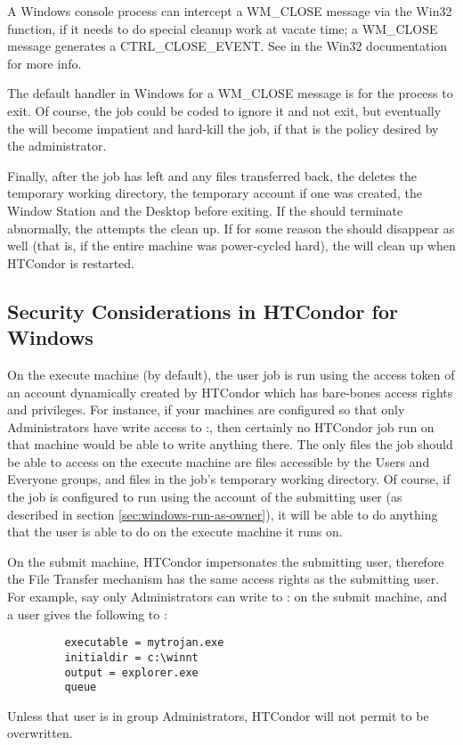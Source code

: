 \Note A Windows console process can intercept a WM\_CLOSE message
via the Win32  function,
if it needs to do special cleanup work at vacate time; 
a WM\_CLOSE message generates a CTRL\_CLOSE\_EVENT.
See  in the Win32
documentation for more info.

\Note The default handler in Windows for a WM\_CLOSE message is for the
process to exit.  Of course, the job could be coded to ignore it and not
exit, but eventually the  will become impatient and hard-kill
the job, if that is the policy desired by the administrator.

Finally, after the job has left and any files transferred back, 
the  deletes the temporary working directory, 
the temporary account if one was created,
the Window Station and the Desktop before exiting. 
If the  should terminate abnormally, 
the  attempts the clean up.  
If for some reason the  should disappear as well
(that is, if the entire machine was power-cycled hard),
the  will clean up when HTCondor is restarted.

\subsection{Security Considerations in HTCondor for Windows}

On the execute machine (by default), the user job is run using the
access token of an account dynamically created by HTCondor which has
bare-bones access rights and privileges.  For instance, if your
machines are configured so that only Administrators have write access
to
\verb@C:\WINNT@, then certainly no HTCondor job run on that machine
would be able to write anything there.  The only files the job should
be able to access on the execute machine are files accessible by the
Users and Everyone groups, and files in the job's temporary working
directory.  Of course, if the job is configured to run using the
account of the submitting user (as described in section
\ref{sec:windows-run-as-owner}), it will be able to do anything that
the user is able to do on the execute machine it runs on.

On the submit machine, HTCondor impersonates the submitting user, therefore
the File Transfer mechanism has the same access rights as the submitting
user.  For example, say only Administrators can write to
\verb@C:\WINNT@
on the submit machine,
and a user gives the following to  :
\begin{verbatim}
         executable = mytrojan.exe
         initialdir = c:\winnt
         output = explorer.exe
         queue
\end{verbatim}
Unless that user is in group Administrators, HTCondor will not permit
 to be overwritten.  

